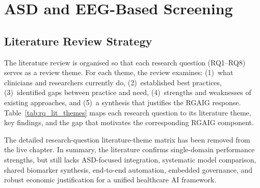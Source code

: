 \section{ASD and EEG-Based Screening}

\subsection{Literature Review Strategy}

The literature review is organised so that each research question (RQ1--RQ8) serves as a review theme. For each theme, the review examines: (1)~what clinicians and researchers currently do, (2)~established best practices, (3)~identified gaps between practice and need, (4)~strengths and weaknesses of existing approaches, and (5)~a synthesis that justifies the RGAIG response. Table~\ref{tab:rq_lit_themes} maps each research question to its literature theme, key findings, and the gap that motivates the corresponding RGAIG component.

The detailed research-question literature-theme matrix has been removed from the live chapter. In summary, the literature confirms single-domain performance strengths, but still lacks ASD-focused integration, systematic model comparison, shared biomarker synthesis, end-to-end automation, embedded governance, and robust economic justification for a unified healthcare AI framework.


